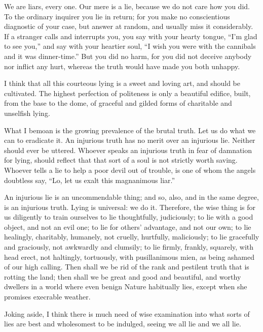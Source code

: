 \documentclass[../interior-demo.tex]{subfiles}
\begin{document}
We are liars, every one. Our mere 
is a lie, because we do not care how you did.
To the ordinary inquirer you lie in return; for you make
no conscientious diagnostic of your case, but answer at random, and
usually miss it considerably. If a stranger calls and interrupts
you, you say with your hearty tongue, ``I'm glad to see you,'' and say
with your heartier soul, ``I wish you were with the cannibals and it was
dinner-time.'' But you did no harm, for you did not
deceive anybody nor inflict any hurt, whereas the truth would have made
you both unhappy.

I think that all this courteous lying is a sweet and loving art, and
should be cultivated. The highest perfection of politeness is only a
beautiful edifice, built, from the base to the dome, of graceful and
gilded forms of charitable and unselfish lying.

What I bemoan is the growing prevalence of the brutal truth. Let us do
what we can to eradicate it. An injurious truth has no merit over an
injurious lie. Neither should ever be uttered. Whoever speaks an
injurious truth in fear of damnation for lying, should
reflect that that sort of a soul is not strictly worth saving.
Whoever tells a lie to help a poor devil out of trouble, is one of whom the
angels doubtless say, ``Lo, let us exalt this magnanimous liar.''

An injurious lie is an uncommendable thing; and so, also, and in the same
degree, is an injurious truth. Lying is universal: we  do it.
Therefore, the wise thing is for us
diligently to train ourselves to lie thoughtfully, judiciously; to lie
with a good object, and not an evil one; to lie for others' advantage,
and not our own; to lie healingly, charitably, humanely, not cruelly,
hurtfully, maliciously; to lie gracefully and graciously, not awkwardly
and clumsily; to lie firmly, frankly, squarely, with head erect, not
haltingly, tortuously, with pusillanimous mien, as being ashamed of our
high calling. Then shall we be rid of the rank and pestilent truth that
is rotting the land; then shall we be great and good and beautiful, and
worthy dwellers in a world where even benign Nature habitually lies,
except when she promises execrable weather.

Joking aside, I think there is much need of wise examination into what
sorts of lies are best and wholesomest to be indulged, seeing we 
all lie and we  all lie.
\end{document}
